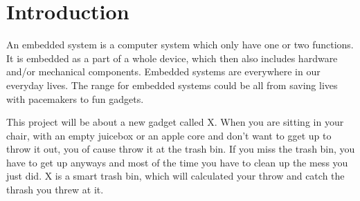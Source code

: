 \chapter{Introduction}
\label{chap:Introduction}

An embedded system is a computer system which only have one or two functions. It is embedded as a part of a whole device, which then also includes hardware and/or mechanical components. Embedded systems are everywhere in our everyday lives. The range for embedded systems could be all from saving lives with pacemakers to fun gadgets.\citep{es}

This project will be about a new gadget called X. When you are sitting in your chair, with an empty juicebox or an apple core and don't want to gget up to throw it out, you of cause throw it at the trash bin. If you miss the trash bin, you have to get up anyways and most of the time you have to clean up the mess you just did. X is a smart trash bin, which will calculated your throw and catch the thrash you threw at it. 
